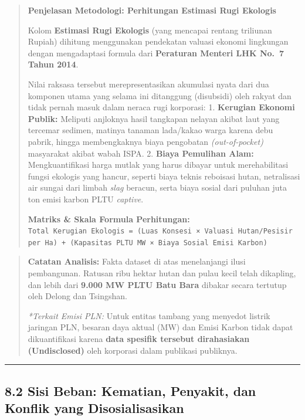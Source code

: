 \documentclass[
]{article}
\begin{document}
\begin{quote}
\textbf{Penjelasan Metodologi: Perhitungan Estimasi Rugi Ekologis}

Kolom \textbf{Estimasi Rugi Ekologis} (yang mencapai rentang triliunan
Rupiah) dihitung menggunakan pendekatan valuasi ekonomi lingkungan
dengan mengadaptasi formula dari \textbf{Peraturan Menteri LHK No.~7
Tahun 2014}.

Nilai raksasa tersebut merepresentasikan akumulasi nyata dari dua
komponen utama yang selama ini ditanggung (disubsidi) oleh rakyat dan
tidak pernah masuk dalam neraca rugi korporasi: 1. \textbf{Kerugian
Ekonomi Publik:} Meliputi anjloknya hasil tangkapan nelayan akibat laut
yang tercemar sedimen, matinya tanaman lada/kakao warga karena debu
pabrik, hingga membengkaknya biaya pengobatan \emph{(out-of-pocket)}
masyarakat akibat wabah ISPA. 2. \textbf{Biaya Pemulihan Alam:}
Mengkuantifikasi harga mutlak yang harus dibayar untuk merehabilitasi
fungsi ekologis yang hancur, seperti biaya teknis reboisasi hutan,
netralisasi air sungai dari limbah \emph{slag} beracun, serta biaya
sosial dari puluhan juta ton emisi karbon PLTU \emph{captive}.

\textbf{Matriks \& Skala Formula Perhitungan:}
\texttt{Total\ Kerugian\ Ekologis\ =\ (Luas\ Konsesi\ ×\ Valuasi\ Hutan/Pesisir\ per\ Ha)\ +\ (Kapasitas\ PLTU\ MW\ ×\ Biaya\ Sosial\ Emisi\ Karbon)}
\end{quote}

\begin{quote}
\textbf{Catatan Analisis:} Fakta dataset di atas menelanjangi ilusi
pembangunan. Ratusan ribu hektar hutan dan pulau kecil telah dikapling,
dan lebih dari \textbf{9.000 MW PLTU Batu Bara} dibakar secara tertutup
oleh Delong dan Tsingshan.

\emph{*Terkait Emisi PLN:} Untuk entitas tambang yang menyedot listrik
jaringan PLN, besaran daya aktual (MW) dan Emisi Karbon tidak dapat
dikuantifikasi karena \textbf{data spesifik tersebut dirahasiakan
(Undisclosed)} oleh korporasi dalam publikasi publiknya.
\end{quote}

\begin{center}\rule{0.5\linewidth}{0.5pt}\end{center}

\subsection{8.2 Sisi Beban: Kematian, Penyakit, dan Konflik yang
Disosialisasikan}\label{sisi-beban-kematian-penyakit-dan-konflik-yang-disosialisasikan}
\end{document}

